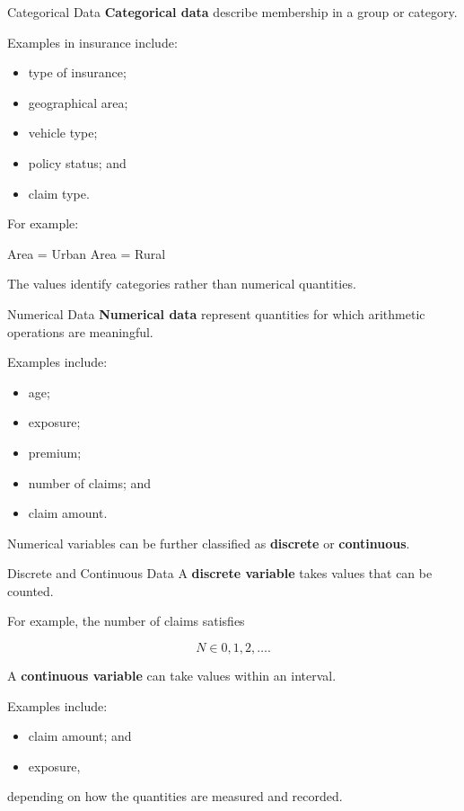 \documentclass[
  ignorenonframetext,
  aspectratio=169,
]{beamer}
\newenvironment{Shaded}{\begin{snugshade}}{\end{snugshade}}
\newcommand{\NormalTok}[1]{\textcolor[rgb]{0.00,0.23,0.31}{#1}}
\providecommand{\tightlist}{%
  \setlength{\itemsep}{0pt}\setlength{\parskip}{0pt}}
\begin{document}
\begin{frame}[fragile]{Categorical Data}
\protect{}\label{categorical-data}
\textbf{Categorical data} describe membership in a group or category.

Examples in insurance include:

\begin{itemize}
\tightlist
\item
  type of insurance;
\item
  geographical area;
\item
  vehicle type;
\item
  policy status; and
\item
  claim type.
\end{itemize}

For example:

\begin{Shaded}
\begin{Highlighting}[]
\NormalTok{Area = Urban}
\NormalTok{Area = Rural}
\end{Highlighting}
\end{Shaded}

The values identify categories rather than numerical quantities.
\end{frame}

\begin{frame}{Numerical Data}
\protect{}\label{numerical-data}
\textbf{Numerical data} represent quantities for which arithmetic
operations are meaningful.

Examples include:

\begin{itemize}
\tightlist
\item
  age;
\item
  exposure;
\item
  premium;
\item
  number of claims; and
\item
  claim amount.
\end{itemize}

Numerical variables can be further classified as \textbf{discrete} or
\textbf{continuous}.
\end{frame}

\begin{frame}{Discrete and Continuous Data}
\protect{}\label{discrete-and-continuous-data}
A \textbf{discrete variable} takes values that can be counted.

For example, the number of claims satisfies

\[
N \in {0,1,2,\ldots}.
\]

A \textbf{continuous variable} can take values within an interval.

Examples include:

\begin{itemize}
\tightlist
\item
  claim amount; and
\item
  exposure,
\end{itemize}

depending on how the quantities are measured and recorded.
\end{frame}
\end{document}
